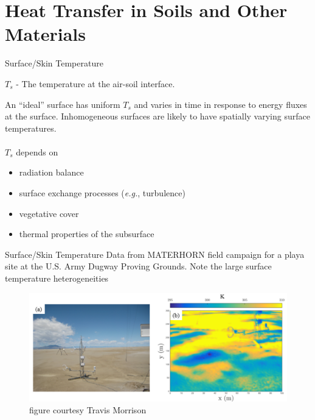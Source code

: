 \section{Heat Transfer in Soils and Other Materials} %
\begin{frame}{Surface/Skin Temperature}
\begin{fancydefs}
	$T_s$  - The temperature at the air-soil interface.
\end{fancydefs}
An ``ideal'' surface has uniform $T_s$ and varies in time in response to energy fluxes at the surface. Inhomogeneous surfaces are likely to have spatially varying surface temperatures. 
~\\~\\
$T_s$ depends on
\begin{itemize}
	\item radiation balance
	\item surface exchange processes (\textit{e.g.}, turbulence)
	\item vegetative cover
	\item thermal properties of the subsurface
\end{itemize}
\end{frame}

\begin{frame}{Surface/Skin Temperature}
Data from MATERHORN field campaign for a playa site at the U.S. Army Dugway Proving Grounds. Note the large surface temperature heterogeneities
\begin{figure}
	\includegraphics[width=\textwidth]{fig15.png}
	\newline \centering \tiny figure courtesy Travis Morrison
\end{figure}
\end{frame}

